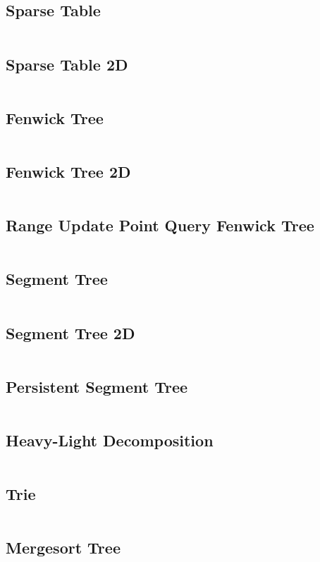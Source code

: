 \documentclass[a4paper, 10pt, twocolumn, landscape]{article}
\begin{document}
  \subsection{Sparse Table}
  \inputminted{cpp}{data-structures/sparse.cpp}
  \subsection{Sparse Table 2D}
  \inputminted{cpp}{data-structures/sparse2d.cpp}
  \subsection{Fenwick Tree}
  \inputminted{cpp}{data-structures/bit.cpp}
  \subsection{Fenwick Tree 2D}
  \inputminted{cpp}{data-structures/bit2d.cpp}
  \subsection{Range Update Point Query Fenwick Tree}
  \inputminted{cpp}{data-structures/bit-range.cpp}
  \subsection{Segment Tree}
  \inputminted{cpp}{data-structures/segtree.cpp}
  \subsection{Segment Tree 2D}
  \inputminted{cpp}{data-structures/segtree2d.cpp}
  \subsection{Persistent Segment Tree}
  \inputminted{cpp}{data-structures/persistent-segtree.cpp}
  \subsection{Heavy-Light Decomposition}
  \inputminted{cpp}{data-structures/hld.cpp}
  \subsection{Trie}
  \inputminted{cpp}{data-structures/trie.cpp}
  \subsection{Mergesort Tree}
  \inputminted{cpp}{data-structures/mergesort-tree.cpp}
\end{document}
